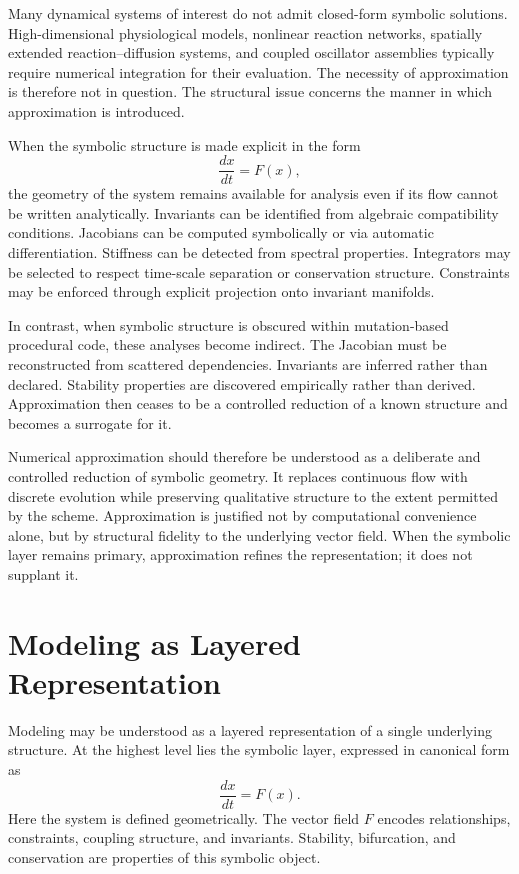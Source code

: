 \documentclass[12pt]{book}
\begin{document}
Many dynamical systems of interest do not admit closed-form symbolic
solutions. High-dimensional physiological models, nonlinear reaction
networks, spatially extended reaction--diffusion systems, and coupled
oscillator assemblies typically require numerical integration for
their evaluation. The necessity of approximation is therefore not in
question. The structural issue concerns the manner in which
approximation is introduced.

When the symbolic structure is made explicit in the form
\[
\frac{dx}{dt} = F(x),
\]
the geometry of the system remains available for analysis even if its
flow cannot be written analytically. Invariants can be identified from
algebraic compatibility conditions. Jacobians can be computed
symbolically or via automatic differentiation. Stiffness can be
detected from spectral properties. Integrators may be selected to
respect time-scale separation or conservation structure. Constraints
may be enforced through explicit projection onto invariant manifolds.

In contrast, when symbolic structure is obscured within mutation-based
procedural code, these analyses become indirect. The Jacobian must be
reconstructed from scattered dependencies. Invariants are inferred
rather than declared. Stability properties are discovered empirically
rather than derived. Approximation then ceases to be a controlled
reduction of a known structure and becomes a surrogate for it.

Numerical approximation should therefore be understood as a deliberate
and controlled reduction of symbolic geometry. It replaces continuous
flow with discrete evolution while preserving qualitative structure to
the extent permitted by the scheme. Approximation is justified not by
computational convenience alone, but by structural fidelity to the
underlying vector field. When the symbolic layer remains primary,
approximation refines the representation; it does not supplant it.

\section{Modeling as Layered Representation}

Modeling may be understood as a layered representation of a single
underlying structure. At the highest level lies the symbolic layer,
expressed in canonical form as
\[
\frac{dx}{dt} = F(x).
\]
Here the system is defined geometrically. The vector field $F$ encodes
relationships, constraints, coupling structure, and invariants.
Stability, bifurcation, and conservation are properties of this
symbolic object.
\end{document}
